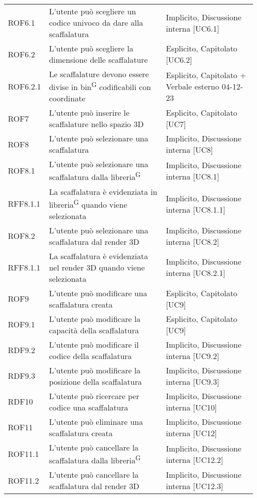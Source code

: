 \begin{xltabular}{\textwidth}{ p{0.1\textwidth} | X | p{0.3\textwidth} }
    ROF6.1 & L'utente può scegliere un codice univoco da dare alla scaffalatura & Implicito, Discussione interna [UC6.1]\\
    ROF6.2 & L'utente può scegliere la dimensione delle scaffalature & Esplicito, Capitolato [UC6.2]\\
    ROF6.2.1 & Le scaffalature devono essere divise in bin\textsuperscript{G} codificabili con coordinate & Esplicito, Capitolato + Verbale esterno 04-12-23\\
    ROF7 & L'utente può inserire le scaffalature nello spazio 3D & Esplicito, Capitolato [UC7]\\
    ROF8 & L'utente può selezionare una scaffalatura & Implicito, Discussione interna [UC8]\\
    ROF8.1 & L'utente può selezionare una scaffalatura dalla libreria\textsuperscript{G} & Implicito, Discussione interna [UC8.1]\\
    RFF8.1.1 & La scaffalatura è evidenziata in libreria\textsuperscript{G} quando viene selezionata & Implicito, Discussione interna [UC8.1.1]\\
    ROF8.2 & L'utente può selezionare una scaffalatura dal render 3D & Implicito, Discussione interna [UC8.2]\\
    RFF8.1.1 & La scaffalatura è evidenziata nel render 3D quando viene selezionata & Implicito, Discussione interna [UC8.2.1]\\
    ROF9 & L'utente può modificare una scaffalatura creata & Esplicito, Capitolato [UC9]\\
    ROF9.1 & L'utente può modificare la capacità della scaffalatura & Esplicito, Capitolato [UC9]\\
    RDF9.2 & L'utente può modificare il codice della scaffalatura & Implicito, Discussione interna [UC9.2]\\
    RDF9.3 & L'utente può modificare la posizione della scaffalatura & Implicito, Discussione interna [UC9.3]\\
    RDF10 & L'utente può ricercare per codice una scaffalatura & Implicito, Discussione interna [UC10]\\
    ROF11 & L'utente può eliminare una scaffalatura creata & Implicito, Discussione interna [UC12]\\
    ROF11.1 & L'utente può cancellare la scaffalatura dalla libreria\textsuperscript{G} & Implicito, Discussione interna [UC12.2]\\
    ROF11.2 & L'utente può cancellare la scaffalatura dal render 3D & Implicito, Discussione interna [UC12.3]\\

\end{xltabular}
